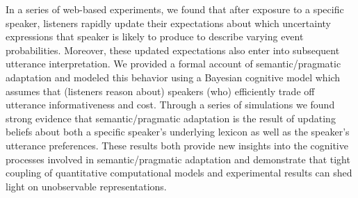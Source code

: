 In a series of web-based experiments, we found that after exposure to a specific speaker, listeners rapidly update 
their expectations about which uncertainty expressions that speaker is likely to produce
to describe varying event probabilities. Moreover, these updated expectations also enter into subsequent utterance interpretation.
We provided a formal account of semantic/pragmatic adaptation and modeled this behavior using a Bayesian cognitive model 
which assumes that (listeners reason about) speakers (who) efficiently trade off utterance informativeness and cost.
Through a series of simulations we found strong evidence that semantic/pragmatic adaptation is the result of
updating beliefs about both a specific speaker's underlying lexicon as well as the speaker's utterance
preferences. These results both provide new insights into the cognitive processes involved in semantic/pragmatic adaptation
and demonstrate that tight coupling of quantitative computational models and experimental results can shed light on
unobservable representations.
